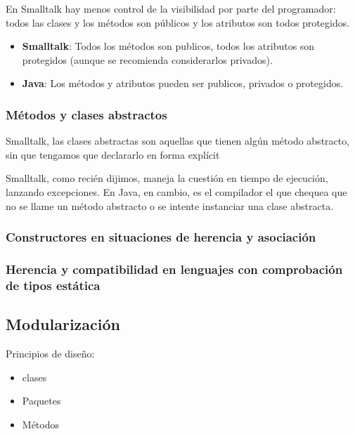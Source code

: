 \documentclass[../main.tex]{subfiles}
\begin{document}
            En Smalltalk hay menos control de la visibilidad por parte del programador: todos las clases y los métodos son públicos y los atributos son todos protegidos.

            \begin{itemize}
                \item \textbf{Smalltalk}: 
                    Todos los métodos son publicos, todos los atributos son protegidos (aunque se recomienda considerarlos privados).
                \item \textbf{Java}: 
                    Los métodos y atributos pueden ser publicos, privados o protegidos.
            \end{itemize}

        \subsubsection{Métodos y clases abstractos}
            Smalltalk, las clases abstractas son aquellas que tienen algún método abstracto, sin que tengamos que declararlo en forma explícit
            
            Smalltalk, como recién dijimos, maneja la cuestión en tiempo de ejecución, lanzando excepciones. En Java, en cambio, es el compilador el que chequea que no se llame un método abstracto o se intente instanciar una clase abstracta.
            
        \subsubsection{Constructores en situaciones de herencia y asociación}
        \subsubsection{Herencia y compatibilidad en lenguajes con comprobación de tipos estática}

    
    \subsection{Modularización}
        Principios de diseño:
        \begin{itemize}
            \item clases
            \item Paquetes
            \item Métodos
        \end{itemize}
\end{document}
